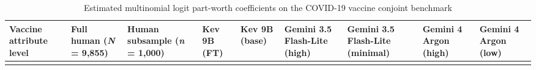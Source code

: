\documentclass[
  11pt,
  letterpaper,
]{article}
\makeatletter
\newcommand\table@defaultsize{\footnotesize}
\let\table@size\table@defaultsize
\newcommand\nexttablesize[1]{\gdef\table@size{#1}}
\makeatother
\begin{document}
\nexttablesize{\scriptsize}
{\def\LTcaptype{apptbl}
\begin{longtable}[]{@{}
  >{\raggedright\arraybackslash}p{}
  >{\raggedleft\arraybackslash}p{}
  >{\raggedleft\arraybackslash}p{}
  >{\raggedleft\arraybackslash}p{}
  >{\raggedleft\arraybackslash}p{}
  >{\raggedleft\arraybackslash}p{}
  >{\raggedleft\arraybackslash}p{}
  >{\raggedleft\arraybackslash}p{}
  >{\raggedleft\arraybackslash}p{}@{}}
\caption{{\label{apptbl-wang-coefs}}Estimated multinomial logit
part-worth coefficients on the COVID-19 vaccine conjoint benchmark}\tabularnewline
\toprule\noalign{}
\begin{minipage}[b]{\linewidth}\raggedright
Vaccine attribute level
\end{minipage} & \begin{minipage}[b]{\linewidth}\raggedleft
Full human (\emph{N} = 9,855)
\end{minipage} & \begin{minipage}[b]{\linewidth}\raggedleft
Human subsample (\emph{n} = 1,000)
\end{minipage} & \begin{minipage}[b]{\linewidth}\raggedleft
Kev 9B (FT)
\end{minipage} & \begin{minipage}[b]{\linewidth}\raggedleft
Kev 9B (base)
\end{minipage} & \begin{minipage}[b]{\linewidth}\raggedleft
Gemini 3.5 Flash-Lite (high)
\end{minipage} & \begin{minipage}[b]{\linewidth}\raggedleft
Gemini 3.5 Flash-Lite (minimal)
\end{minipage} & \begin{minipage}[b]{\linewidth}\raggedleft
Gemini 4 Argon (high)
\end{minipage} & \begin{minipage}[b]{\linewidth}\raggedleft
Gemini 4 Argon (low)
\end{minipage} \\
\midrule\noalign{}
\endfirsthead
\toprule\noalign{}
\begin{minipage}[b]{\linewidth}\raggedright

\end{minipage}
\end{longtable}}
\end{document}
